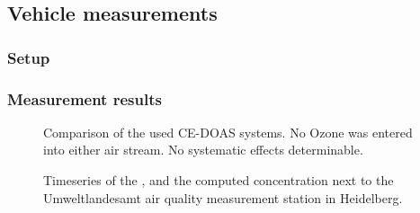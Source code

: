 \subsection{Vehicle measurements}
\label{sec:vehicle}

\subsubsection{Setup}
\label{sec:vehicle-setup}

\subsubsection{Measurement results}
\label{sec:vehicle-meas}

\begin{figure}[htbp]
  \centering
  
  \caption{Comparison of the used CE-DOAS systems. No Ozone was
    entered into either air stream. No systematic effects
    determinable.}
  \label{fig:hd-comparison}
\end{figure}

\begin{figure}[htbp]
  \centering
  
  \caption{Timeseries of the ,  and the computed
     concentration next to the Umweltlandesamt air quality
    measurement station in Heidelberg.}
  \label{fig:umba}
\end{figure}

